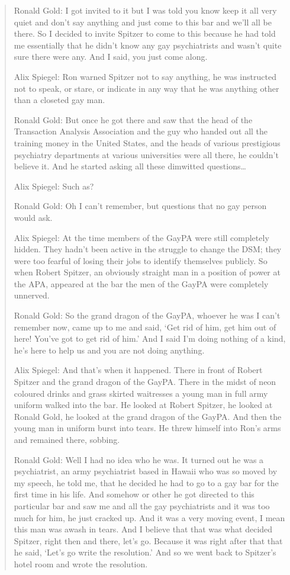 \begin{quote}

Ronald Gold: I got invited to it but I was told you know keep it all very quiet and don't say anything and just come to this bar and we'll all be there. So I decided to invite Spitzer to come to this because he had told me essentially that he didn't know any gay psychiatrists and wasn't quite sure there were any. And I said, you just come along.

Alix Spiegel: Ron warned Spitzer not to say anything, he was instructed not to speak, or stare, or indicate in any way that he was anything other than a closeted gay man.

Ronald Gold: But once he got there and saw that the head of the Transaction Analysis Association and the guy who handed out all the training money in the United States, and the heads of various prestigious psychiatry departments at various universities were all there, he couldn't believe it. And he started asking all these dimwitted questions{\ldots}

Alix Spiegel: Such as?

Ronald Gold: Oh I can't remember, but questions that no gay person would ask.

Alix Spiegel: At the time members of the GayPA were still completely hidden. They hadn't been active in the struggle to change the DSM; they were too fearful of losing their jobs to identify themselves publicly. So when Robert Spitzer, an obviously straight man in a position of power at the APA, appeared at the bar the men of the GayPA were completely unnerved.

Ronald Gold: So the grand dragon of the GayPA, whoever he was I can't remember now, came up to me and said, `Get rid of him, get him out of here! You've got to get rid of him.' And I said I'm doing nothing of a kind, he's here to help us and you are not doing anything.

Alix Spiegel: And that's when it happened. There in front of Robert Spitzer and the grand dragon of the GayPA. There in the midst of neon coloured drinks and grass skirted waitresses a young man in full army uniform walked into the bar. He looked at Robert Spitzer, he looked at Ronald Gold, he looked at the grand dragon of the GayPA. And then the young man in uniform burst into tears. He threw himself into Ron's arms and remained there, sobbing.

Ronald Gold: Well I had no idea who he was. It turned out he was a psychiatrist, an army psychiatrist based in Hawaii who was so moved by my speech, he told me, that he decided he had to go to a gay bar for the first time in his life. And somehow or other he got directed to this particular bar and saw me and all the gay psychiatrists and it was too much for him, he just cracked up. And it was a very moving event, I mean this man was awash in tears. And I believe that that was what decided Spitzer, right then and there, let's go. Because it was right after that that he said, `Let's go write the resolution.' And so we went back to Spitzer's hotel room and wrote the resolution.
\end{quote}

